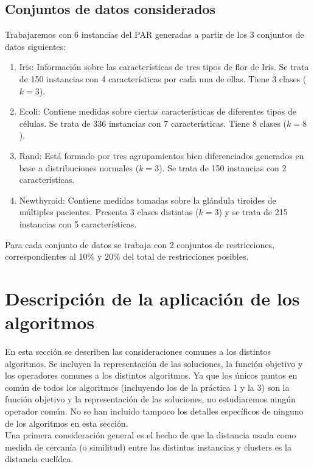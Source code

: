 \documentclass[11pt,a4paper]{article}
\begin{document}
	\subsection{Conjuntos de datos considerados}
	Trabajaremos con 6 instancias del PAR generadas a partir de los 3 conjuntos de datos siguientes:
	\begin{enumerate}
        \item Iris: Información sobre las características de tres tipos de flor de Iris. Se trata de 150 instancias con 4 características por cada una de ellas. Tiene 3 clases ($k = 3$).
        \item Ecoli: Contiene medidas sobre ciertas características de diferentes tipos de células. Se trata de 336 instancias con 7 características. Tiene 8 clases ($k = 8$).
        \item Rand: Está formado por tres agrupamientos bien diferenciados generados en base a distribuciones normales ($k = 3$). Se trata de 150 instancias con 2 características.
        \item Newthyroid: Contiene medidas tomadas sobre la glándula tiroides de múltiples pacientes. Presenta 3 clases distintas ($k = 3$) y se trata de 215 instancias con 5 características.
  \end{enumerate}
    
    Para cada conjunto de datos se trabaja con 2 conjuntos de restricciones, correspondientes al 10\% y 20\% del total de restricciones posibles.
	
	
	\section{Descripción de la aplicación de los algoritmos}\label{sec:comun}
	
	En esta sección se describen las consideraciones comunes a los distintos algoritmos. Se incluyen la representación de las soluciones, la función objetivo y los operadores comunes a los distintos algoritmos. Ya que los únicos puntos en común de todos los algoritmos (incluyendo los de la práctica 1 y la 3) son la función objetivo y la representación de las soluciones, no estudiaremos ningún operador común. No se han incluido tampoco los detalles específicos de ninguno de los algoritmos en esta sección.  \\
	
	Una primera consideración general es el hecho de que la distancia usada como medida de cercanía (o similitud) entre las distintas instancias y clusters es la distancia euclídea. \\
	
\end{document}
